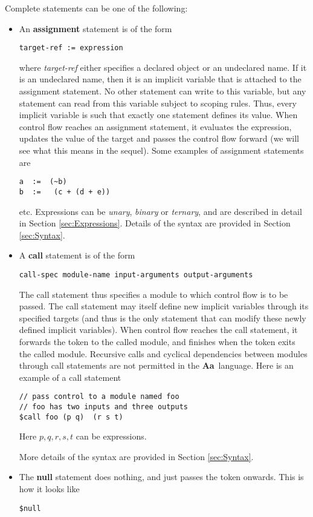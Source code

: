 \documentclass{article}
\newcommand{\Aa}{{\bf Aa}~}
\begin{document}
Complete statements can be one of the following:
\begin{itemize}
\item An {\bf assignment} statement is of the form
\begin{verbatim}
target-ref := expression
\end{verbatim}
where {\em target-ref} either specifies a declared object
or an undeclared name.  If it is an undeclared name, then
it is an implicit variable that is attached to the
assignment statement.  No other statement can write to this
variable, but any statement can read from this variable
subject to scoping rules.  Thus, every implicit variable
is such that exactly one statement defines its value.
When control flow reaches an assignment statement, it
evaluates the expression, updates the value of the target
and passes the control flow forward (we will see what this
means in the sequel).
Some examples of assignment statements are 
\begin{verbatim}
a  :=  (~b)
b  :=   (c + (d + e))
\end{verbatim}
etc.   Expressions can be {\em unary},
{\em binary} or {\em ternary}, and are
described in detail in Section \ref{sec:Expressions}.
Details of the syntax are provided in 
Section \ref{sec:Syntax}.
\item A {\bf call} statement is of the form
\begin{verbatim}
call-spec module-name input-arguments output-arguments
\end{verbatim}
The call statement thus specifies a module to which control flow
is to be passed.  The call statement may itself define new implicit
variables through its specified targets (and thus is the only
statement that can modify these newly defined implicit variables).
When control flow reaches the call statement, it forwards the
token to the called module, and finishes when the token exits
the called module.  Recursive calls and cyclical dependencies between
modules through call statements are not permitted in the \Aa language.
Here is an example of a call statement
\begin{verbatim}
// pass control to a module named foo
// foo has two inputs and three outputs
$call foo (p q)  (r s t)
\end{verbatim}
Here $p,q,r,s,t$ can be expressions.

More details of the syntax are provided in 
Section \ref{sec:Syntax}.

\item The {\bf null} statement does nothing, and just passes the
token onwards.  This is how it looks like
\begin{verbatim}
$null
\end{verbatim}
\end{itemize}
\end{document}
